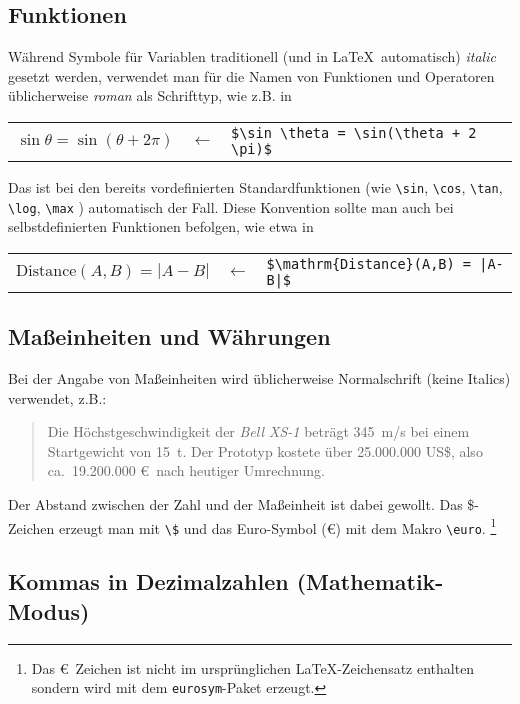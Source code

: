 \subsection{Funktionen}

Während Symbole für Variablen traditionell (und in \LaTeX{}\ automatisch) \emph{italic} gesetzt werden, verwendet man für die Namen von Funktionen und Operatoren üblicherweise
\emph{roman} als Schrifttyp, wie z.B. in
\begin{center}
\begin{tabular}{lcl}
	$\sin \theta = \sin(\theta + 2 \pi)$ & 
	$\leftarrow$ & \verb!$\sin \theta = \sin(\theta + 2 \pi)$! \\
	\end{tabular}
\end{center}
Das ist bei den bereits vordefinierten Standardfunktionen (wie
\verb!\sin!,
\verb!\cos!,
\verb!\tan!,
\verb!\log!,
\verb!\max!
) automatisch der Fall.
Diese Konvention sollte man auch bei selbstdefinierten Funktionen befolgen,
wie etwa in
\begin{center}
	\begin{tabular}{lcl}
	$\mathrm{Distance}(A,B) = |A-B|$ & $\leftarrow$ & \verb!$\mathrm{Distance}(A,B) = |A-B|$! \\
	\end{tabular}
\end{center}


\subsection{Maßeinheiten und Währungen}

Bei der Angabe von Maßeinheiten wird üblicherweise Normalschrift
(keine Italics) verwendet, z.B.:
\begin{quote}
Die Höchstgeschwindigkeit der \textit{Bell XS-1} beträgt 345~m/s
bei einem Startgewicht von 15~t. 
Der Prototyp kostete über 25.000.000 US\$, also ca.\ 19.200.000 \euro\ nach heutiger Umrechnung.
\end{quote}
Der Abstand zwischen der Zahl und der Maßeinheit ist dabei
gewollt.
Das \$-Zeichen erzeugt man mit \verb!\$! und
das Euro-Symbol (\euro) mit dem Makro \verb!\euro!.%
\footnote{Das \euro\ Zeichen ist nicht im ursprünglichen \LaTeX{}-Zeichensatz enthalten
sondern wird mit dem \texttt{eurosym}-Paket erzeugt.}


\subsection{Kommas in Dezimalzahlen (Mathematik-Modus)}

